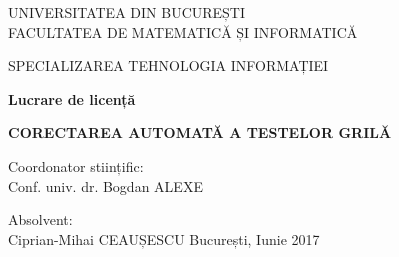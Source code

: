\documentclass[a4paper,12pt]{report}
\newcommand\tab[1][1cm]{\hspace*{#1}}
\begin{document}
\begin{titlepage}
	\begin{center}
	\centering
	{\scshape\Large UNIVERSITATEA DIN BUCUREȘTI\\FACULTATEA DE MATEMATICĂ ȘI INFORMATICĂ\par}
	{\scshape\Large SPECIALIZAREA TEHNOLOGIA INFORMAȚIEI\par}
	\vspace{3cm}
	{\Huge\bfseries Lucrare de licență \par}
	\vspace{1cm}	
	{\Huge\bfseries CORECTAREA AUTOMATĂ A TESTELOR GRILĂ\par}
	\vspace{3.5cm}
	\end{center}
	{\large Coordonator stiințific: \\ Conf. univ. dr. Bogdan ALEXE\par}
	\vspace{1cm}
	{\large \tab \tab \tab \tab \tab  \tab \tab \tab \tab \tab  \tab \tab \tab \tab Absolvent: \\ \tab \tab  \tab  \tab   \tab  \tab    \tab \tab \tab \tab \hfill Ciprian-Mihai CEAUȘESCU}
	\vfill
	\centering
	{\large București, Iunie 2017}
\end{titlepage}
\end{document}
